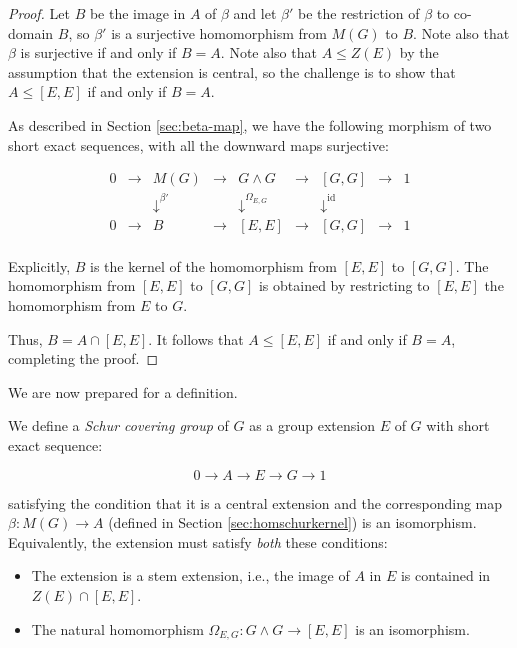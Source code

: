\begin{proof}
  Let $B$ be the image in $A$ of $\beta$ and let $\beta'$ be the
  restriction of $\beta$ to co-domain $B$, so $\beta'$ is a surjective
  homomorphism from $M(G)$ to $B$. Note also that $\beta$ is
  surjective if and only if $B = A$. Note also that $A \le Z(E)$ by
  the assumption that the extension is central, so the challenge is to
  show that $A \le [E,E]$ if and only if $B = A$.

  As described in Section \ref{sec:beta-map}, we have the following
  morphism of two short exact sequences, with all the downward maps
  surjective:

  $$\begin{array}{ccccccccc}
    0 & \to & M(G) & \to & G \wedge G & \to & [G,G] & \to & 1\\
    &&   \downarrow^{\beta'}  &&  \downarrow^{\Omega_{E,G}}     && \downarrow^{\text{id}} && \\
    0 & \to & B &\to & [E,E] & \to & [G,G] & \to & 1\\
  \end{array}$$

  Explicitly, $B$ is the kernel of the homomorphism from $[E,E]$ to
  $[G,G]$. The homomorphism from $[E,E]$ to $[G,G]$ is obtained by
  restricting to $[E,E]$ the homomorphism from $E$ to $G$. 

  Thus, $B = A \cap [E,E]$. It follows that $A \le [E,E]$ if and only
  if $B = A$, completing the proof.
\end{proof}

We are now prepared for a definition.

\begin{definer}
  We define a {\em Schur covering group} of $G$ as a group
  extension $E$ of $G$ with short exact sequence:

  $$0 \to A \to E \to G \to 1$$
  
  satisfying the condition that it is a central extension and the
  corresponding map $\beta: M(G) \to A$ (defined in Section
  \ref{sec:homschurkernel}) is an isomorphism. Equivalently, the
  extension must satisfy {\em both} these conditions:
  
  \begin{itemize}
  \item The extension is a stem extension, i.e., the image of $A$ in $E$
    is contained in $Z(E) \cap [E,E]$.
  \item The natural homomorphism $\Omega_{E,G}: G \wedge G \to [E,E]$ is an
    isomorphism.
  \end{itemize}
\end{definer}
  
